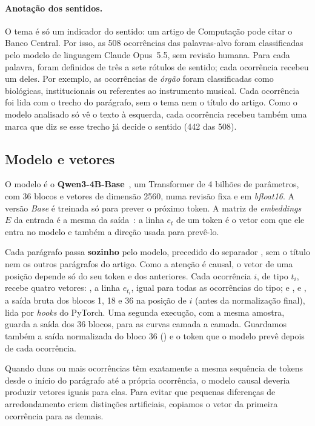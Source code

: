 \paragraph{Anotação dos sentidos.}\label{sec:dados-sentidos} O tema é só um indicador do
sentido: um artigo de Computação pode citar o Banco Central. Por isso, as 508 ocorrências das
palavras-alvo foram classificadas pelo modelo de linguagem Claude Opus~5.5, sem revisão humana.
Para cada palavra, foram definidos de três a sete rótulos de sentido; cada ocorrência recebeu
um deles. Por exemplo, as ocorrências de \emph{órgão} foram classificadas como biológicas,
institucionais ou referentes ao instrumento musical. Cada ocorrência foi lida com o trecho do
parágrafo, sem o tema nem o título do artigo. Como o modelo
analisado só vê o texto à esquerda, cada ocorrência recebeu também uma marca que diz se esse
trecho já decide o sentido (442 das 508).

\subsection{Modelo e vetores}\label{sec:modelo}

O modelo é o \textbf{Qwen3-4B-Base}~\cite{qwen3}, um Transformer de 4 bilhões de parâmetros,
com 36 blocos e vetores de dimensão 2560, numa revisão fixa e em \emph{bfloat16}. A versão
\emph{Base} é treinada só para prever o próximo token. A matriz de \emph{embeddings} $E$ da
entrada é a mesma da saída~\cite{press2017}: a linha $e_t$ de um token é o vetor com que ele
entra no modelo e também a direção usada para prevê-lo.

Cada parágrafo passa \textbf{sozinho} pelo modelo, precedido do separador
, sem o título nem os outros parágrafos do artigo. Como a atenção é causal,
o vetor de uma posição depende só do seu token e dos anteriores. Cada ocorrência $i$, de tipo
$t_i$, recebe quatro vetores: , a linha $e_{t_i}$, igual para todas as ocorrências do
tipo; e ,  e , a saída bruta dos blocos 1, 18 e 36 na posição de
$i$ (antes da normalização final), lida por \emph{hooks} do PyTorch. Uma segunda execução, com
a mesma amostra, guarda a saída dos 36 blocos, para as curvas camada a camada. Guardamos também
a saída normalizada do bloco 36 () e o token que o modelo prevê depois de cada
ocorrência. 

Quando duas ou mais ocorrências têm exatamente a mesma sequência de tokens desde o
início do parágrafo até a própria ocorrência, o modelo causal deveria produzir vetores iguais
para elas. Para evitar que pequenas diferenças de arredondamento criem distinções artificiais,
copiamos o vetor da primeira ocorrência para as demais.


